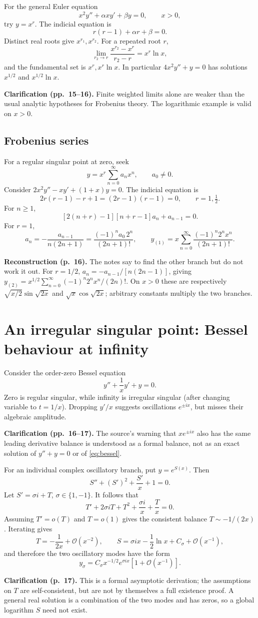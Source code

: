 \documentclass[11pt,a4paper]{article}
\newcommand{\OO}{\mathcal O}
\newcommand{\src}[1]{\par\smallskip{\small\color{gray}Source PDF: page(s) #1.}\par}
\newcommand{\edit}[2]{\par\begingroup\small\color{blue!55!black}\textbf{#1.} #2\par\endgroup}
\numberwithin{equation}{section}
\begin{document}
For the general Euler equation
\[
 x^2y''+\alpha xy'+\beta y=0,\qquad x>0,
\]
try $y=x^r$. The indicial equation is
\[
 r(r-1)+\alpha r+\beta=0.
\]
Distinct real roots give $x^{r_1},x^{r_2}$. For a repeated root $r$,
\[
 \lim_{r_2\to r}\frac{x^{r_2}-x^r}{r_2-r}=x^r\ln x,
\]
and the fundamental set is $x^r,x^r\ln x$.
In particular $4x^2y''+y=0$ has solutions
$x^{1/2}$ and $x^{1/2}\ln x$.
\edit{Clarification (pp.~15--16)}{Finite weighted limits alone are
weaker than the usual analytic hypotheses for Frobenius theory.
The logarithmic example is valid on $x>0$.}

\subsection{Frobenius series}
For a regular singular point at zero, seek
\[
 y=x^r\sum_{n=0}^\infty a_nx^n,\qquad a_0\ne0.
\]
Consider $2x^2y''-xy'+(1+x)y=0$. The indicial equation is
\[
 2r(r-1)-r+1=(2r-1)(r-1)=0,
 \qquad r=1,\tfrac12.
\]
For $n\ge1$,
\[
 [2(n+r)-1][n+r-1]a_n+a_{n-1}=0.
\]
For $r=1$,
\[
 a_n=-\frac{a_{n-1}}{n(2n+1)}
 =\frac{(-1)^na_0\,2^n}{(2n+1)!},\qquad
 y_{(1)}=x\sum_{n=0}^\infty\frac{(-1)^n2^nx^n}{(2n+1)!}.
\]
\edit{Reconstruction (p.~16)}{The notes say to find the other branch
but do not work it out. For $r=1/2$,
$a_n=-a_{n-1}/[n(2n-1)]$, giving
$y_{(2)}=x^{1/2}\sum_{n=0}^\infty(-1)^n2^nx^n/(2n)!$.
On $x>0$ these are respectively
$\sqrt{x/2}\sin\sqrt{2x}$ and $\sqrt{x}\cos\sqrt{2x}$;
arbitrary constants multiply the two branches.}

\section{An irregular singular point: Bessel behaviour at infinity}
\src{16--18}
Consider the order-zero Bessel equation
\begin{equation}\label{eq:bessel}
 y''+\frac1xy'+y=0.
\end{equation}
Zero is regular singular, while infinity is irregular singular
(after changing variable to $t=1/x$). Dropping $y'/x$ suggests
oscillations $e^{\pm ix}$, but misses their algebraic amplitude.
\edit{Clarification (pp.~16--17)}{The source's warning that
$xe^{\pm ix}$ also has the same leading derivative balance is
understood as a formal balance, not as an exact solution of
$y''+y=0$ or of \eqref{eq:bessel}.}
For an individual complex oscillatory branch, put $y=e^{S(x)}$.
Then
\[
 S''+(S')^2+\frac{S'}x+1=0.
\]
Let $S'=\sigma i+T$, $\sigma\in\{1,-1\}$. It follows that
\[
 T'+2\sigma iT+T^2+\frac{\sigma i}x+\frac Tx=0.
\]
Assuming $T'=o(T)$ and $T=o(1)$ gives the consistent balance
$T\sim-1/(2x)$. Iterating gives
\[
 T=-\frac1{2x}+\OO(x^{-2}),\qquad
 S=\sigma ix-\frac12\ln x+C_\sigma+\OO(x^{-1}),
\]
and therefore the two oscillatory modes have the form
\[
 y_\sigma=C_\sigma x^{-1/2}e^{\sigma ix}
 [1+\OO(x^{-1})].
\]
\edit{Clarification (p.~17)}{This is a formal asymptotic derivation;
the assumptions on $T$ are self-consistent, but are not by themselves
a full existence proof. A general real solution is a combination of
the two modes and has zeros, so a global logarithm $S$ need not exist.}
\end{document}
